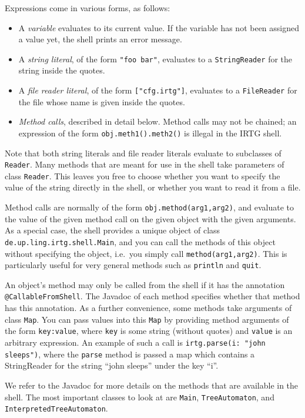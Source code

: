 \documentclass[11pt]{article}
\begin{document}
Expressions come in various forms, as follows:
\begin{itemize}
\item A \emph{variable} evaluates to its current value. If the
  variable has not been assigned a value yet, the shell prints an
  error message.
\item A \emph{string literal}, of the form \verb?"foo bar"?, evaluates
  to a \verb?StringReader? for the string inside the quotes. 
\item A \emph{file reader literal}, of the form \verb?["cfg.irtg"]?,
  evaluates to a \verb?FileReader? for the file whose name is given
  inside the quotes.
\item \emph{Method calls}, described in detail below. Method
  calls may not be chained; an expression of the form
  \verb?obj.meth1().meth2()? is illegal in the IRTG shell.
\end{itemize}

Note that both string literals and file reader literals evaluate to
subclasses of \verb?Reader?.  Many methods that are meant for use in
the shell take parameters of class \verb?Reader?.  This leaves you
free to choose whether you want to specify the value of the string
directly in the shell, or whether you want to read it from a file.

Method calls are normally of the form \verb?obj.method(arg1,arg2)?,
and evaluate to the value of the given method call on the given object
with the given arguments.  As a special case, the shell provides a
unique object of class \verb?de.up.ling.irtg.shell.Main?, and you
can call the methods of this object without specifying the object,
i.e.\ you simply call \verb?method(arg1,arg2)?.  This is particularly
useful for very general methods such as \verb?println? and
\verb?quit?.

An object's method may only be called from the shell if it has the
annotation \verb?@CallableFromShell?.  The Javadoc of each method
specifies whether that method has this annotation.  As a further
convenience, some methods take arguments of class \verb?Map?.  You can
pass values into this \verb?Map? by providing method arguments of the
form \verb?key:value?, where \verb?key? is some string (without
quotes) and \verb?value? is an arbitrary expression.  An example of
such a call is \verb?irtg.parse(i: "john sleeps")?, where the
\verb?parse? method is passed a map which contains a StringReader for
the string ``john sleeps'' under the key ``i''.

We refer to the Javadoc for more details on the methods that are
available in the shell.  The most important classes to look at are
\verb?Main?, \verb?TreeAutomaton?, and
\verb?InterpretedTreeAutomaton?.
\end{document}
